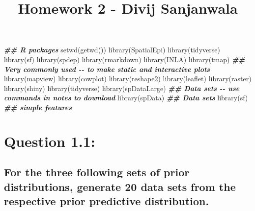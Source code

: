 \documentclass[
]{article}
\title{Homework 2 - Divij Sanjanwala}
\author{}
\date{\vspace{-2.5em}}
\newenvironment{Shaded}{\begin{snugshade}}{\end{snugshade}}
\newcommand{\DocumentationTok}[1]{\textcolor[rgb]{0.56,0.35,0.01}{\textbf{\textit{#1}}}}
\newcommand{\FunctionTok}[1]{\textcolor[rgb]{0.00,0.00,0.00}{#1}}
\newcommand{\NormalTok}[1]{#1}
\begin{document}
\maketitle

\begin{Shaded}
\begin{Highlighting}[]
\DocumentationTok{\#\# R packages }
\FunctionTok{setwd}\NormalTok{(}\FunctionTok{getwd}\NormalTok{())}
\FunctionTok{library}\NormalTok{(SpatialEpi)}
\FunctionTok{library}\NormalTok{(tidyverse)}
\FunctionTok{library}\NormalTok{(sf)}
\FunctionTok{library}\NormalTok{(spdep)}
\FunctionTok{library}\NormalTok{(rmarkdown)}
\FunctionTok{library}\NormalTok{(INLA)}
\FunctionTok{library}\NormalTok{(tmap) }\DocumentationTok{\#\# Very commonly used {-}{-} to make static and interactive plots}
\FunctionTok{library}\NormalTok{(mapview)}
\FunctionTok{library}\NormalTok{(cowplot)}
\FunctionTok{library}\NormalTok{(reshape2)}
\FunctionTok{library}\NormalTok{(leaflet)}
\FunctionTok{library}\NormalTok{(raster)}
\FunctionTok{library}\NormalTok{(shiny)}
\FunctionTok{library}\NormalTok{(tidyverse)}
\FunctionTok{library}\NormalTok{(spDataLarge) }\DocumentationTok{\#\# Data sets {-}{-} use commands in notes to download}
\FunctionTok{library}\NormalTok{(spData) }\DocumentationTok{\#\# Data sets}
\FunctionTok{library}\NormalTok{(sf) }\DocumentationTok{\#\# simple features }
\end{Highlighting}
\end{Shaded}

\hypertarget{question-1.1}{%
\section{Question 1.1:}\label{question-1.1}}

\hypertarget{for-the-three-following-sets-of-prior-distributions-generate-20-data-sets-from-the-respective-prior-predictive-distribution.}{%
\subsection{For the three following sets of prior distributions,
generate 20 data sets from the respective prior predictive
distribution.}\label{for-the-three-following-sets-of-prior-distributions-generate-20-data-sets-from-the-respective-prior-predictive-distribution.}}
\end{document}
